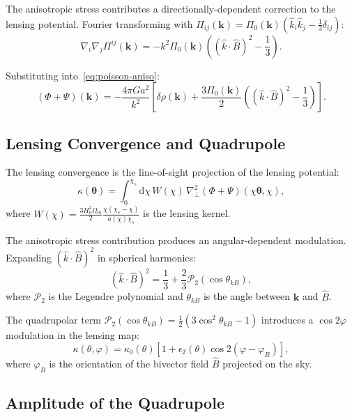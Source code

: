 \documentclass[11pt,a4paper]{article}
\numberwithin{equation}{section}
\theoremstyle{plain}
\theoremstyle{definition}
\theoremstyle{remark}
\newcommand{\dd}{\mathrm{d}}
\begin{document}
The anisotropic stress contributes a directionally-dependent correction to the lensing potential. Fourier transforming with $\Pi_{ij}(\bm{k}) = \Pi_0(\bm{k})\left(\hat k_i \hat k_j - \frac{1}{3}\delta_{ij}\right)$:
\begin{equation}
\nabla_i\nabla_j\Pi^{ij}(\bm{k}) = -k^2 \Pi_0(\bm{k})\left((\hat k \cdot \hat B)^2 - \frac{1}{3}\right).
\end{equation}

Substituting into~\eqref{eq:poisson-aniso}:
\begin{equation}
(\Phi + \Psi)(\bm{k}) = -\frac{4\pi G a^2}{k^2}\left[\delta\rho(\bm{k}) + \frac{3\Pi_0(\bm{k})}{2}\left((\hat k \cdot \hat B)^2 - \frac{1}{3}\right)\right].
\end{equation}

\subsection{Lensing Convergence and Quadrupole}

The lensing convergence is the line-of-sight projection of the lensing potential:
\begin{equation}
\kappa(\bm{\theta}) = \int_0^{\chi_s} \dd\chi\,W(\chi)\,\nabla_\perp^2(\Phi + \Psi)(\chi\bm{\theta}, \chi),
\end{equation}
where $W(\chi) = \frac{3H_0^2\Omega_m}{2}\frac{\chi(\chi_s - \chi)}{a(\chi)\chi_s}$ is the lensing kernel.

The anisotropic stress contribution produces an angular-dependent modulation. Expanding $(\hat k \cdot \hat B)^2$ in spherical harmonics:
\begin{equation}
(\hat k \cdot \hat B)^2 = \frac{1}{3} + \frac{2}{3}\mathcal{P}_2(\cos\theta_{k B}),
\end{equation}
where $\mathcal{P}_2$ is the Legendre polynomial and $\theta_{k B}$ is the angle between $\bm{k}$ and $\hat B$.

The quadrupolar term $\mathcal{P}_2(\cos\theta_{k B}) = \frac{1}{2}(3\cos^2\theta_{k B} - 1)$ introduces a $\cos 2\varphi$ modulation in the lensing map:
\begin{equation}
\kappa(\theta, \varphi) = \kappa_0(\theta)\left[1 + \epsilon_2(\theta)\cos 2(\varphi - \varphi_B)\right],
\end{equation}
where $\varphi_B$ is the orientation of the bivector field $\hat B$ projected on the sky.

\subsection{Amplitude of the Quadrupole}
\end{document}
